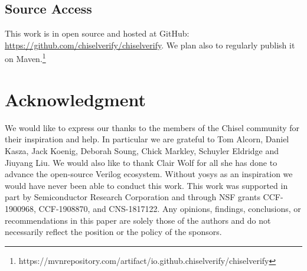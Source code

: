 \documentclass[conference]{IEEEtran}
\begin{document}
\subsection*{Source Access}

This work is in open source and hosted at GitHub:\\ \url{https://github.com/chiselverify/chiselverify}.
We plan also to regularly publish it on Maven.\footnote{https://mvnrepository.com/artifact/io.github.chiselverify/chiselverify}


\section*{Acknowledgment}
We would like to express our thanks to the members of the Chisel community for their 
inspiration and help. %
In particular we are grateful to Tom Alcorn, Daniel Kasza, Jack Koenig, Deborah Soung,
Chick Markley, Schuyler Eldridge and Jiuyang Liu.
We would also like to thank Clair Wolf for all she has done to advance the open-source Verilog ecosystem.
Without yosys as an inspiration we would have never been able to conduct this work.
This work was supported in part by Semiconductor Research Corporation and through NSF grants CCF-1900968, CCF-1908870, and CNS-1817122.
Any opinions, findings, conclusions, or recommendations in this
paper are solely those of the authors and do not necessarily
reflect the position or the policy of the sponsors.



\end{document}

